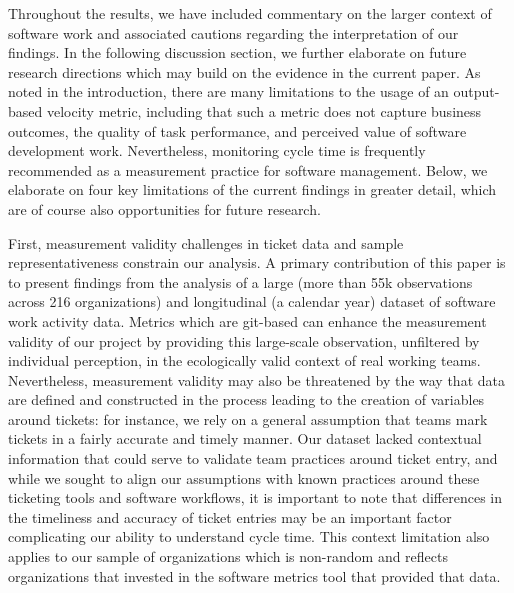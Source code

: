 \documentclass[manuscript,screen,review]{acmart}
\begin{document}
Throughout the results, we have included commentary on the larger
context of software work and associated cautions regarding the
interpretation of our findings. In the following discussion section, we
further elaborate on future research directions which may build on the
evidence in the current paper. As noted in the introduction, there are
many limitations to the usage of an output-based velocity metric,
including that such a metric does not capture business outcomes, the
quality of task performance, and perceived value of software development
work. Nevertheless, monitoring cycle time is frequently recommended as a
measurement practice for software management. Below, we elaborate on
four key limitations of the current findings in greater detail, which
are of course also opportunities for future research.

First, measurement validity challenges in ticket data and sample
representativeness constrain our analysis. A primary contribution of
this paper is to present findings from the analysis of a large (more
than 55k observations across 216 organizations) and longitudinal (a
calendar year) dataset of software work activity data. Metrics which are
git-based can enhance the measurement validity of our project by
providing this large-scale observation, unfiltered by individual
perception, in the ecologically valid context of real working teams.
Nevertheless, measurement validity may also be threatened by the way
that data are defined and constructed in the process leading to the
creation of variables around tickets: for instance, we rely on a general
assumption that teams mark tickets in a fairly accurate and timely
manner. Our dataset lacked contextual information that could serve to
validate team practices around ticket entry, and while we sought to
align our assumptions with known practices around these ticketing tools
and software workflows, it is important to note that differences in the
timeliness and accuracy of ticket entries may be an important factor
complicating our ability to understand cycle time. This context
limitation also applies to our sample of organizations which is
non-random and reflects organizations that invested in the software
metrics tool that provided that data.
\end{document}
